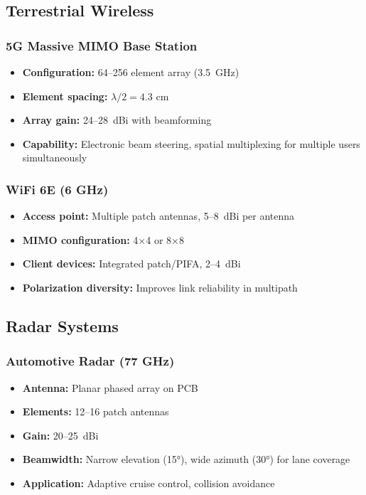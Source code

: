 \subsection{Terrestrial Wireless}

\subsubsection{5G Massive MIMO Base Station}
\begin{itemize}
\item \textbf{Configuration:} 64--256 element array (3.5~GHz)
\item \textbf{Element spacing:} $\lambda/2 = 4.3$ cm
\item \textbf{Array gain:} 24--28~dBi with beamforming
\item \textbf{Capability:} Electronic beam steering, spatial multiplexing for multiple users simultaneously
\end{itemize}

\subsubsection{WiFi 6E (6 GHz)}
\begin{itemize}
\item \textbf{Access point:} Multiple patch antennas, 5--8~dBi per antenna
\item \textbf{MIMO configuration:} 4$\times$4 or 8$\times$8
\item \textbf{Client devices:} Integrated patch/PIFA, 2--4~dBi
\item \textbf{Polarization diversity:} Improves link reliability in multipath
\end{itemize}

\subsection{Radar Systems}

\subsubsection{Automotive Radar (77 GHz)}
\begin{itemize}
\item \textbf{Antenna:} Planar phased array on PCB
\item \textbf{Elements:} 12--16 patch antennas
\item \textbf{Gain:} 20--25~dBi
\item \textbf{Beamwidth:} Narrow elevation (15$°$), wide azimuth (30$°$) for lane coverage
\item \textbf{Application:} Adaptive cruise control, collision avoidance
\end{itemize}

